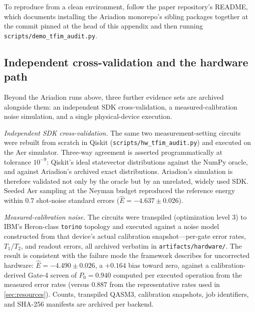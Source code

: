 To reproduce from a clean environment, follow the paper repository's README, which documents installing the Ariadion monorepo's sibling packages together at the commit pinned at the head of this appendix and then running \texttt{scripts/demo\_tfim\_audit.py}.

\subsection{Independent cross-validation and the hardware path}

Beyond the Ariadion runs above, three further evidence sets are archived alongside them: an independent SDK cross-validation, a measured-calibration noise simulation, and a single physical-device execution.

\emph{Independent SDK cross-validation.} The same two measurement-setting circuits were rebuilt from scratch in Qiskit (\texttt{scripts/hw\_tfim\_audit.py}) and executed on the Aer simulator. Three-way agreement is asserted programmatically at tolerance $10^{-9}$: Qiskit's ideal statevector distributions against the NumPy oracle, and against Ariadion's archived exact distributions. Ariadion's simulation is therefore validated not only by the oracle but by an unrelated, widely used SDK. Seeded Aer sampling at the Neyman budget reproduced the reference energy within $0.7$ shot-noise standard errors ($\hat{E}=-4.637\pm0.026$).

\emph{Measured-calibration noise.} The circuits were transpiled (optimization level 3) to IBM's Heron-class \texttt{torino} topology and executed against a noise model constructed from that device's actual calibration snapshot---per-gate error rates, $T_1$/$T_2$, and readout errors, all archived verbatim in \texttt{artifacts/hardware/}. The result is consistent with the failure mode the framework describes for uncorrected hardware: $\hat{E}=-4.490\pm0.026$, a $+0.164$ bias toward zero, against a calibration-derived Gate-4 screen of $P_0=0.940$ computed per executed operation from the measured error rates (versus $0.887$ from the representative rates used in \cref{sec:resources}). Counts, transpiled QASM3, calibration snapshots, job identifiers, and SHA-256 manifests are archived per backend.

